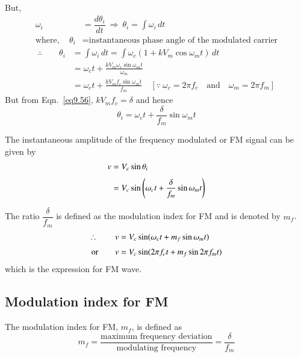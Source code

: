 But, 
\begin{align*}
\omega_{i} &= \dfrac{d\theta_{i}}{dt} \ \Rightarrow \ \theta_{i}=\int \omega_{i} \,dt\\[3pt]
\text{where},\quad \theta_{i} &= \text{instantaneous phase angle of the modulated carrier}
\end{align*}
\begin{align*}
\therefore\qquad \theta_{i} &= \int \omega_{i}\,dt=\int \omega_{c}(1+kV_{m}\cos \omega_{m}t)\,dt\\[3pt]
&= \omega_{c}t+\frac{kV_{m}\omega_{c}\sin \omega_{m}t}{\omega_{m}}\\[3pt]
&= \omega_{c}t+\frac{kV_{m}f_{c}\sin \omega_{m}t}{f_{m}}\quad [\because \ \omega_{c}=2\pi f_{c}\text{~~ and~~ } \omega_{m}=2\pi f_{m}]
\end{align*}
But from Eqn.~\eqref{eq9.56}, $kV_{m}f_{c}=\delta$ and hence
\begin{equation}
\theta_{i}=\omega_{c}t+\dfrac{\delta}{f_{m}}\sin \omega_{m}t\label{eq9.62}
\end{equation}

The instantaneous amplitude of the frequency modulated or FM signal can be given by
\begin{align}
v &= V_{c}\sin \theta_{i}\notag\\[3pt]
&= V_{c}\sin \left(\omega_{c}t+\dfrac{\delta}{f_{m}}\sin \omega_{m}t\right)\label{eq9.63}
\end{align}

The ratio $\dfrac{\delta}{f_{m}}$ is defined as the modulation index for FM and is denoted by $m_{f}$.
\begin{align}
\therefore\qquad v &= V_{c}\sin (\omega_{c}t+m_{f}\sin \omega_{m}t)\notag\\[3pt]
\text{or}\qquad v &= V_{c}\sin (2\pi f_{c}t+m_{f}\sin 2\pi f_{m}t)
\end{align}
which is the expression for FM wave.

\subsection{Modulation index for FM}\label{sec9.18.5}

The modulation index for FM, $m_{f}$, is defined as
\begin{equation}
m_{f}=\frac{\text{maximum frequency deviation}}{\text{modulating frequency}}=\dfrac{\delta}{f_{m}}\label{eq9.65}
\end{equation}

